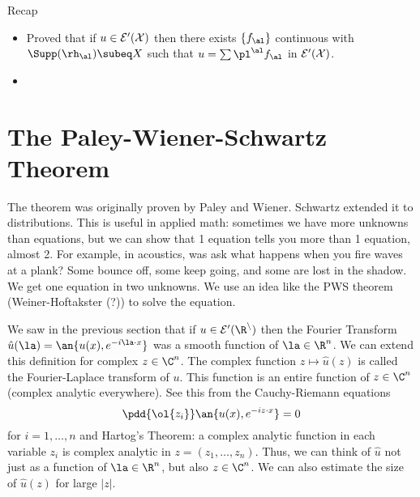 Recap
\begin{itemize}
\item
Proved that if $u\in \cal E'(X)$ then there exists $\{f_{\al}\}$ continuous with $\Supp(\rh_\al)\subeq X$ such that $u=\sum \pl^{\al}f_\al$ in $\cal E'(X)$. 
\item
{}
\end{itemize}

\section{The Paley-Wiener-Schwartz Theorem}
The theorem was originally proven by Paley and Wiener. Schwartz extended it to distributions. This is useful in applied math: sometimes we have more unknowns than equations, 
but we can show that 1 equation tells you more than 1 equation, almost 2. For example, in acoustics, was ask
what happens when you fire waves at a plank? Some bounce off, some keep going, and some are lost in the shadow. We get one equation in two unknowns. We use an idea like the PWS theorem (Weiner-Hoftakster (?)) to solve the equation.

We saw in the previous section that if $u\in \cal E'(\R^n)$ then the Fourier Transform $\hat u(\la)=\an{u(x),e^{-i\la \cdot x}}$ was a smooth function of $\la\in \R^n$. We can extend this definition for complex $z\in \C^n$. The complex function $z\mapsto \hat u(z)$ is called the Fourier-Laplace transform of $u$. This function is an entire function of $z\in \C^n$ (complex analytic everywhere). See this from the Cauchy-Riemann equations
\[
\pdd{\ol{z_i}} \an{u(x),e^{-iz\cdot x}}=0
\]
for $i=1,\ldots, n$ and Hartog's Theorem: a complex analytic function in each variable $z_i$ is complex analytic in $z=(z_1,\ldots, z_n)$. Thus, we can think of $\hat u$ not just as a function of $\la\in \R^n$, but also $z\in \C^n$. We can also estimate the size of $\hat u(z)$ for large $|z|$.

